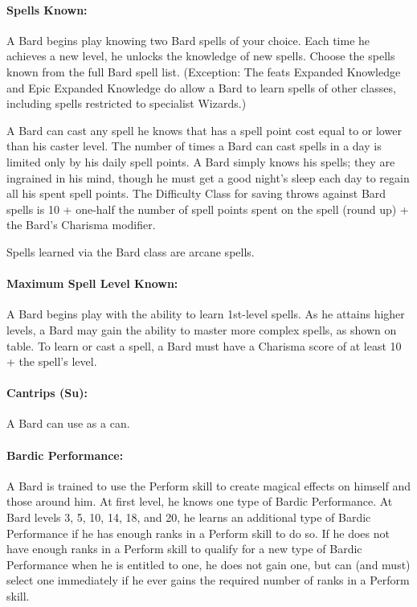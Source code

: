 \paragraph{Spells Known:} A Bard begins play knowing two Bard spells of your choice. 
Each time he achieves a new level, he unlocks the knowledge of new spells.
Choose the spells known from the full Bard spell list.
(Exception: The feats Expanded Knowledge and Epic Expanded Knowledge 
do allow a Bard to learn spells of other classes, 
including spells restricted to specialist Wizards.) 

A Bard can cast any spell he knows that has a spell point cost equal to or lower than his caster level.
The number of times a Bard can cast spells in a day is limited only by his daily spell points. 
A Bard simply knows his spells; they are ingrained in his mind, 
though he must get a good night's sleep each day to regain all his spent spell points.
The Difficulty Class for saving throws against Bard spells is 10 + one-half the number of spell points spent on the spell (round up) + the Bard's Charisma modifier. 

Spells learned via the Bard class are arcane spells.
\paragraph{Maximum Spell Level Known:} A Bard begins play with the ability to learn 1st-level spells. 
As he attains higher levels, a Bard may gain the ability to master more complex spells, as shown on  table.
To learn or cast a spell, a Bard must have a Charisma score of at least 10 + the spell's level.

\paragraph[Cantrips]{Cantrips (Su):} 
A Bard can use  as a  can.

\paragraph{Bardic Performance:}
A Bard is trained to use the Perform skill to create magical effects on himself and those around him. At first level, he knows one type of Bardic Performance. At Bard levels 3, 5, 10, 14, 18, and 20, he learns an additional type of Bardic Performance if he has enough ranks in a Perform skill to do so. If he does not have enough ranks in a Perform skill to qualify for a new type of Bardic Performance when he is entitled to one, he does not gain one, but can (and must) select one immediately if he ever gains the required number of ranks in a Perform skill.


